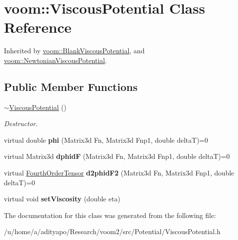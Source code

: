 \hypertarget{classvoom_1_1_viscous_potential}{
\section{voom::ViscousPotential Class Reference}
\label{classvoom_1_1_viscous_potential}
}


Inherited by \hyperlink{classvoom_1_1_blank_viscous_potential}{voom::BlankViscousPotential}, and \hyperlink{classvoom_1_1_newtonian_viscous_potential}{voom::NewtonianViscousPotential}.\subsection*{Public Member Functions}
\begin{DoxyCompactItemize}
\item 
\hypertarget{classvoom_1_1_viscous_potential_aba85c75a536cc0cf6affc5cc731cfde4}{
\hyperlink{classvoom_1_1_viscous_potential_aba85c75a536cc0cf6affc5cc731cfde4}{$\sim$ViscousPotential} ()}
\label{classvoom_1_1_viscous_potential_aba85c75a536cc0cf6affc5cc731cfde4}

\begin{DoxyCompactList}\small\item\em Destructor. \item\end{DoxyCompactList}\item 
\hypertarget{classvoom_1_1_viscous_potential_a78e49130cc85eb0432e67498f00c0213}{
virtual double {\bfseries phi} (Matrix3d Fn, Matrix3d Fnp1, double deltaT)=0}
\label{classvoom_1_1_viscous_potential_a78e49130cc85eb0432e67498f00c0213}

\item 
\hypertarget{classvoom_1_1_viscous_potential_af1f930b4408e784dea155813d751ffb7}{
virtual Matrix3d {\bfseries dphidF} (Matrix3d Fn, Matrix3d Fnp1, double deltaT)=0}
\label{classvoom_1_1_viscous_potential_af1f930b4408e784dea155813d751ffb7}

\item 
\hypertarget{classvoom_1_1_viscous_potential_a2151290d9ae261d22dab19bbf0c84b67}{
virtual \hyperlink{classvoom_1_1_fourth_order_tensor}{FourthOrderTensor} {\bfseries d2phidF2} (Matrix3d Fn, Matrix3d Fnp1, double deltaT)=0}
\label{classvoom_1_1_viscous_potential_a2151290d9ae261d22dab19bbf0c84b67}

\item 
\hypertarget{classvoom_1_1_viscous_potential_a8e927bf877a5059c16454f64de855cc2}{
virtual void {\bfseries setViscosity} (double eta)}
\label{classvoom_1_1_viscous_potential_a8e927bf877a5059c16454f64de855cc2}

\end{DoxyCompactItemize}


The documentation for this class was generated from the following file:\begin{DoxyCompactItemize}
\item 
/u/home/a/adityapo/Research/voom2/src/Potential/ViscousPotential.h\end{DoxyCompactItemize}
